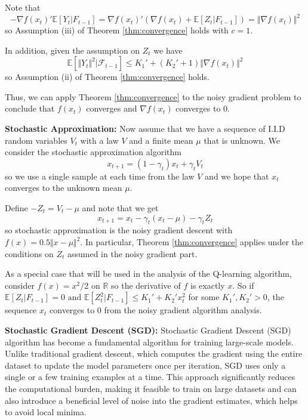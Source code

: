 \documentclass[letter,11pt]{article}
\begin{document}
Note that 
$$ - \nabla f(x_{t})' \mathbb{E} [Y_{t} | F_{t-1} ] = \nabla f(x_{t})' (\nabla f(x_{t}) +  \mathbb{E} [Z_{t} | F_{t-1} ] ) = \Vert \nabla f(x_{t})  \Vert ^{2} $$
so Assumption (iii) of Theorem \ref{thm:convergence} holds with $c=1$. 

In addition, given the assumption on $Z_{t}$ we have
  $$\mathbb{E}[\Vert Y_{t} \Vert ^{2} | \mathcal{F}_{t-1} ] \leq  K_{1}' + (K_{2}' +1)\Vert \nabla f(x_{t}) \Vert ^{2} $$
so Assumption (ii) of Theorem \ref{thm:convergence} holds.

Thus, we can apply Theorem \ref{thm:convergence} to the noisy gradient problem to conclude that $f(x_{t})$ converges and $\nabla f(x_{t})$ converges to $0$. 

\textbf{Stochastic Approximation:} \label{SA}
Now assume that we have a sequence of I.I.D random variables $V_{t}$ with a law $V$ and a finite mean $\mu$ that is unknown. We consider the stochastic approximation algorithm 
$$ x_{t+1} = (1-\gamma_{t})x_{t} + \gamma_{t} V_{t}$$
so we use a single sample at each time from the law $V$ and we hope that $x_{t}$ converges to the unknown mean $\mu$. 

Define $-Z_{t} = V_{t} - \mu$ and note that we get 
$$ x_{t+1} = x_{t} - \gamma_{t} (x_{t} - \mu) - \gamma _{t} Z_{t}$$
so stochastic approximation is the noisy gradient descent with $f(x) = 0.5 \Vert x-\mu \Vert ^{2} $. In particular, Theorem \ref{thm:convergence} applies under the conditions on $Z_{t}$ assumed in the noisy gradient part.  

As a special case that will be used in the analysis of the Q-learning algorithm, consider $f(x)=x^{2}/2$ on  $\mathbb{R}$ so the derivative of $f$ is exactly $x$. So if $\mathbb{E} [Z_{t} | F_{t-1} ] = 0 \text { and } \mathbb{E} [  Z_{t}  ^{2}| F_{t-1} ] \leq K_{1}' + K_{2}' x_{t}^{2}$ for some $K_{1}' , K_{2}'  >0$, the sequence $x_{t}$ converges to $0$ from the noisy gradient algorithm analysis.  


\textbf{Stochastic Gradient Descent (SGD):} 
Stochastic Gradient Descent (SGD) algorithm has become a fundamental algorithm for training large-scale models. Unlike traditional gradient descent, which computes the gradient using the entire dataset to update the model parameters once per iteration, SGD uses only a single or a few training examples at a time. This approach significantly reduces the computational burden, making it feasible to train on large datasets and can also introduce a beneficial level of noise into the gradient estimates, which helps to avoid local minima. 
\end{document}
